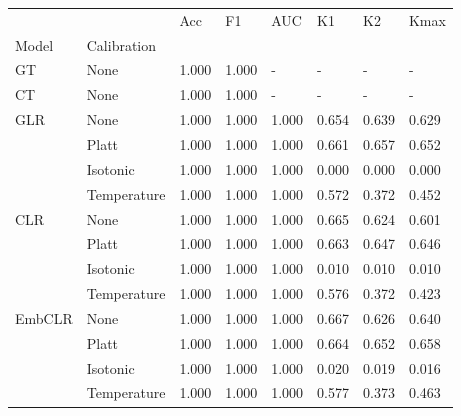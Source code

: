 \begin{tabular}{llllllll}
\toprule
 &  & Acc & F1 & AUC & K1 & K2 & Kmax \\
Model & Calibration &  &  &  &  &  &  \\
\midrule
GT & None & 1.000 & 1.000 & - & - & - & - \\
\cline{1-8}
CT & None & 1.000 & 1.000 & - & - & - & - \\
\cline{1-8}
\multirow[t]{4}{*}{GLR} & None & 1.000 & 1.000 & 1.000 & 0.654 & 0.639 & 0.629 \\
 & Platt & 1.000 & 1.000 & 1.000 & 0.661 & 0.657 & 0.652 \\
 & Isotonic & 1.000 & 1.000 & 1.000 & 0.000 & 0.000 & 0.000 \\
 & Temperature & 1.000 & 1.000 & 1.000 & 0.572 & 0.372 & 0.452 \\
\cline{1-8}
\multirow[t]{4}{*}{CLR} & None & 1.000 & 1.000 & 1.000 & 0.665 & 0.624 & 0.601 \\
 & Platt & 1.000 & 1.000 & 1.000 & 0.663 & 0.647 & 0.646 \\
 & Isotonic & 1.000 & 1.000 & 1.000 & 0.010 & 0.010 & 0.010 \\
 & Temperature & 1.000 & 1.000 & 1.000 & 0.576 & 0.372 & 0.423 \\
\cline{1-8}
\multirow[t]{4}{*}{EmbCLR} & None & 1.000 & 1.000 & 1.000 & 0.667 & 0.626 & 0.640 \\
 & Platt & 1.000 & 1.000 & 1.000 & 0.664 & 0.652 & 0.658 \\
 & Isotonic & 1.000 & 1.000 & 1.000 & 0.020 & 0.019 & 0.016 \\
 & Temperature & 1.000 & 1.000 & 1.000 & 0.577 & 0.373 & 0.463 \\
\cline{1-8}
\bottomrule
\end{tabular}
